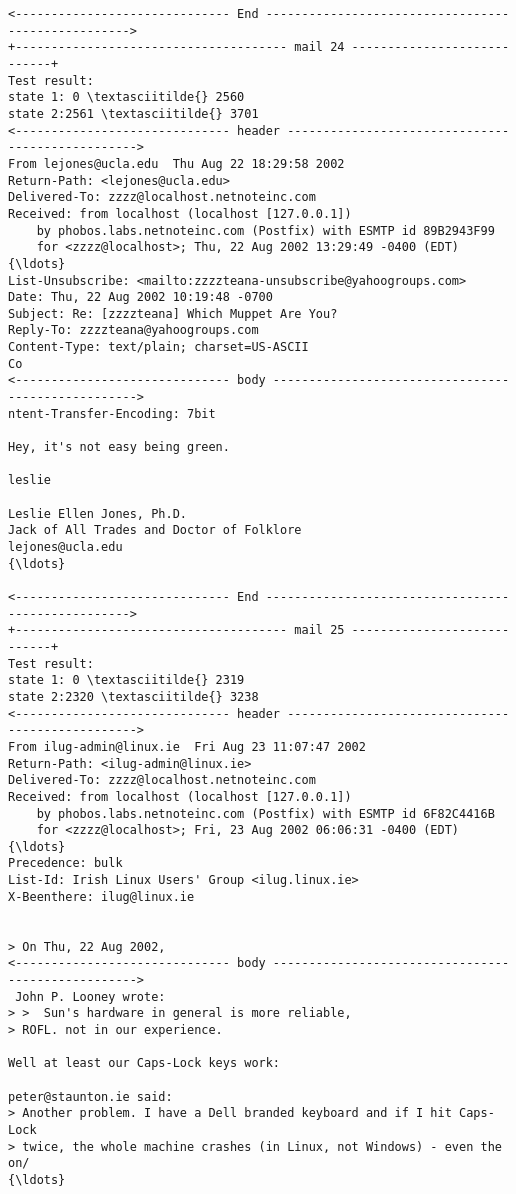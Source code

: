 \documentclass[11pt]{article}
\begin{document}
\begin{Verbatim}[commandchars=\\\{\}]
<------------------------------ End --------------------------------------------------->
+-------------------------------------- mail 24 ----------------------------+
Test result:
state 1: 0 \textasciitilde{} 2560
state 2:2561 \textasciitilde{} 3701
<------------------------------ header ------------------------------------------------->
From lejones@ucla.edu  Thu Aug 22 18:29:58 2002
Return-Path: <lejones@ucla.edu>
Delivered-To: zzzz@localhost.netnoteinc.com
Received: from localhost (localhost [127.0.0.1])
	by phobos.labs.netnoteinc.com (Postfix) with ESMTP id 89B2943F99
	for <zzzz@localhost>; Thu, 22 Aug 2002 13:29:49 -0400 (EDT)
{\ldots}
List-Unsubscribe: <mailto:zzzzteana-unsubscribe@yahoogroups.com>
Date: Thu, 22 Aug 2002 10:19:48 -0700
Subject: Re: [zzzzteana] Which Muppet Are You?
Reply-To: zzzzteana@yahoogroups.com
Content-Type: text/plain; charset=US-ASCII
Co
<------------------------------ body --------------------------------------------------->
ntent-Transfer-Encoding: 7bit

Hey, it's not easy being green.

leslie

Leslie Ellen Jones, Ph.D.
Jack of All Trades and Doctor of Folklore
lejones@ucla.edu
{\ldots}

<------------------------------ End --------------------------------------------------->
+-------------------------------------- mail 25 ----------------------------+
Test result:
state 1: 0 \textasciitilde{} 2319
state 2:2320 \textasciitilde{} 3238
<------------------------------ header ------------------------------------------------->
From ilug-admin@linux.ie  Fri Aug 23 11:07:47 2002
Return-Path: <ilug-admin@linux.ie>
Delivered-To: zzzz@localhost.netnoteinc.com
Received: from localhost (localhost [127.0.0.1])
	by phobos.labs.netnoteinc.com (Postfix) with ESMTP id 6F82C4416B
	for <zzzz@localhost>; Fri, 23 Aug 2002 06:06:31 -0400 (EDT)
{\ldots}
Precedence: bulk
List-Id: Irish Linux Users' Group <ilug.linux.ie>
X-Beenthere: ilug@linux.ie


> On Thu, 22 Aug 2002,
<------------------------------ body --------------------------------------------------->
 John P. Looney wrote:
> >  Sun's hardware in general is more reliable,
> ROFL. not in our experience.

Well at least our Caps-Lock keys work:

peter@staunton.ie said:
> Another problem. I have a Dell branded keyboard and if I hit Caps-Lock
> twice, the whole machine crashes (in Linux, not Windows) - even the on/
{\ldots}


\end{Verbatim}
\end{document}
